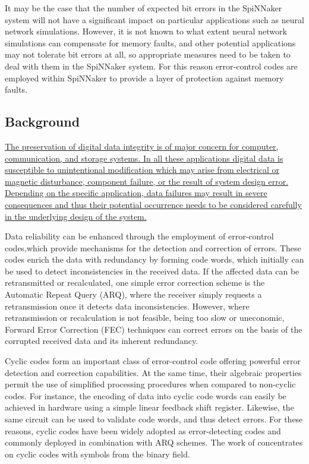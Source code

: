 \documentclass[a4paper, 11pt]{article}
\begin{document}
It may be the case that the number of expected bit errors in the SpiNNaker system will not have a significant impact on particular applications such as neural network simulations. However, it is not known to what extent neural network simulations can compensate for memory faults, and other potential applications may not tolerate bit errors at all, so appropriate measures need to be taken to deal with them in the SpiNNaker system. For this reason error-control codes are employed within SpiNNaker to provide a layer of protection against memory faults.

\subsection{Background}
\ul{The preservation of digital data integrity is of major concern for computer, communication, and storage systems. In all these applications digital data is susceptible to unintentional modification which may arise from electrical or magnetic disturbance, component failure, or the result of system design error. Depending on the specific application, data failures may result in severe consequences and thus their potential occurrence needs to be considered carefully in the underlying design of the system.}

Data reliability can be enhanced through the employment of error-control codes,which provide mechanisms for the detection and correction of errors. These codes enrich the data with redundancy by forming code words, which initially can be used to detect inconsistencies in the received data. If the affected data can be retransmitted or recalculated, one simple error correction scheme is the Automatic Repeat Query (ARQ), where the receiver simply requests a retransmission once it detects data inconsistencies. However, where retransmission or recalculation is not feasible, being too slow or uneconomic, Forward Error Correction (FEC) techniques can correct errors on the basis of the corrupted received data and its inherent redundancy.

Cyclic codes form an important class of error-control code offering powerful error detection and correction capabilities. At the same time, their algebraic properties permit the use of simplified processing procedures when compared to non-cyclic codes. For instance, the encoding of data into cyclic code words can easily be achieved in hardware using a simple linear feedback shift register. Likewise, the same circuit can be used to validate code words, and thus detect errors. For these reasons, cyclic codes have been widely adopted as error-detecting codes and commonly deployed in combination with ARQ schemes. The work of \citet{grymel2013error} concentrates on cyclic codes with symbols from the binary field.
\end{document}
